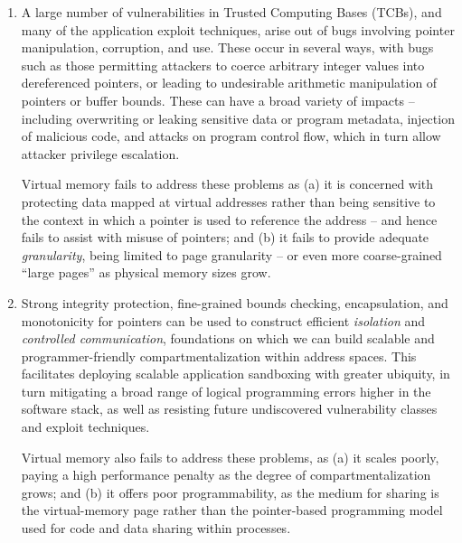 \begin{enumerate}
\item A large number of vulnerabilities in Trusted Computing Bases (TCBs), and
  many of the application exploit techniques, arise out of bugs involving
  pointer manipulation, corruption, and use.
  These occur in several ways, with bugs such as those permitting attackers to
  coerce arbitrary integer values into dereferenced pointers, or leading to
  undesirable arithmetic manipulation of pointers or buffer bounds.
  These can have a broad variety of impacts -- including overwriting or leaking
  sensitive data or program metadata, injection of malicious code, and attacks
  on program control flow, which in turn allow attacker privilege escalation.

  Virtual memory fails to address these problems as (a) it is concerned with
  protecting data mapped at virtual addresses rather than being sensitive to
  the context in which a pointer is used to reference the address -- and hence
  fails to assist with misuse of pointers; and (b) it fails to provide
  adequate \textit{granularity}, being limited to page granularity -- or even
  more coarse-grained ``large pages'' as physical memory sizes grow.

\item Strong integrity protection, fine-grained bounds checking,
  encapsulation, and monotonicity for pointers can be used to construct
  efficient \textit{isolation} and \textit{controlled communication},
  foundations on which we can build scalable and programmer-friendly
  compartmentalization within address spaces.
  This facilitates deploying scalable application sandboxing with greater
  ubiquity, in turn mitigating a broad range of logical programming errors
  higher in the software stack, as well as resisting future undiscovered
  vulnerability classes and exploit techniques.

  Virtual memory also fails to address these problems, as (a) it scales
  poorly, paying a high performance penalty as the degree of
  compartmentalization grows; and (b) it offers poor programmability,
  as the medium for sharing is the virtual-memory page rather than the
  pointer-based programming model used for code and data sharing within
  processes.
\end{enumerate}

